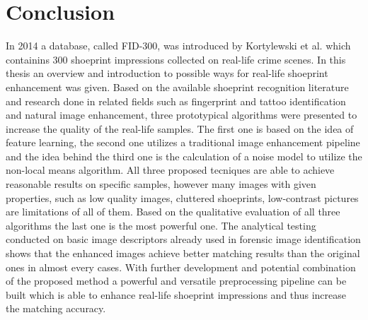 \documentclass[draft,final]{vutinfth} %
\begin{document}
\chapter{Conclusion}
\par
In 2014 a database, called FID-300, was introduced by Kortylewski et al. \cite{kortylewski2014unsupervised} which containins 300 shoeprint impressions collected on real-life crime scenes.
In this thesis an overview and introduction to possible ways for real-life shoeprint enhancement was given.
Based on the available shoeprint recognition literature and research done in related fields such as fingerprint and tattoo identification and natural image enhancement, three prototypical algorithms were presented to increase the quality of the real-life samples.
The first one is based on the idea of feature learning, the second one utilizes a traditional image enhancement pipeline and the idea behind the third one is the calculation of a noise model to utilize the non-local means algorithm.
All three proposed tecniques are able to achieve reasonable results on specific samples, however many images with given properties, such as low quality images, cluttered shoeprints, low-contrast pictures are limitations of all of them.
Based on the qualitative evaluation of all three algorithms the last one is the most powerful one.
The analytical testing conducted on basic image descriptors already used in forensic image identification shows that the enhanced images achieve better matching results than the original ones in almost every cases.
With further development and potential combination of the proposed method a powerful and versatile preprocessing pipeline can be built which is able to enhance real-life shoeprint impressions and thus increase the matching accuracy.
\end{document}
